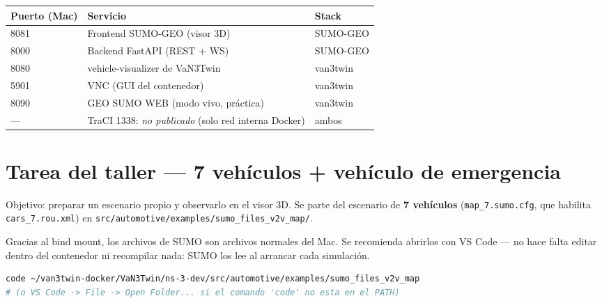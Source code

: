 \documentclass[11pt,a4paper]{article}
\begin{document}
\begin{center}
\begin{tabular}{@{}lll@{}}
\toprule
\textbf{Puerto (Mac)} & \textbf{Servicio} & \textbf{Stack} \\
\midrule
8081 & Frontend SUMO-GEO (visor 3D)            & SUMO-GEO \\
8000 & Backend FastAPI (REST + WS)             & SUMO-GEO \\
8080 & vehicle-visualizer de VaN3Twin          & van3twin \\
5901 & VNC (GUI del contenedor)                & van3twin \\
8090 & GEO SUMO WEB (modo vivo, práctica)      & van3twin \\
---  & TraCI 1338: \emph{no publicado} (solo red interna Docker) & ambos \\
\bottomrule
\end{tabular}
\end{center}

\section{Tarea del taller — 7 vehículos + vehículo de emergencia}

Objetivo: preparar un escenario propio y observarlo en el visor 3D. Se parte del
escenario de \textbf{7 vehículos} (\texttt{map\_7.sumo.cfg}, que habilita
\texttt{cars\_7.rou.xml}) en
\texttt{src/automotive/examples/sumo\_files\_v2v\_map/}.

\begin{notabox}
Gracias al bind mount, los archivos de SUMO son archivos normales del Mac.
Se recomienda abrirlos con VS Code --- no hace falta editar dentro del contenedor
ni recompilar nada: SUMO los lee al arrancar cada simulación.
\begin{lstlisting}[language=bash]
code ~/van3twin-docker/VaN3Twin/ns-3-dev/src/automotive/examples/sumo_files_v2v_map
# (o VS Code -> File -> Open Folder... si el comando 'code' no esta en el PATH)
\end{lstlisting}
\end{notabox}
\end{document}

